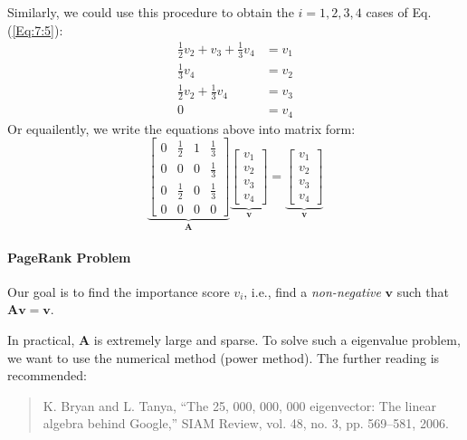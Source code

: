 \begin{example}
Similarly, we could use this procedure to obtain the $i=1,2,3,4$ cases of Eq.(\ref{Eq:7:5}):
\begin{align*}
\frac{1}{2}v_2+v_3+\frac{1}{3}v_4&=v_1\\
\frac{1}{3}v_4&=v_2\\
\frac{1}{2}v_2+\frac{1}{3}v_4&=v_3\\
0&=v_4
\end{align*}
Or equailently, we write the equations above into matrix form:
\[
\underbrace{\begin{bmatrix}
0&\frac{1}{2}&1&\frac{1}{3}\\
0&0&0&\frac{1}{3}\\
0&\frac{1}{2}&0&\frac{1}{3}\\
0&0&0&0
\end{bmatrix}}_{\bm A}\underbrace{\begin{bmatrix}
v_1\\v_2\\v_3\\v_4
\end{bmatrix}}_{\bm v}=\underbrace{\begin{bmatrix}
v_1\\v_2\\v_3\\v_4
\end{bmatrix}}_{\bm v}
\]
\end{example}
\paragraph{PageRank Problem}Our goal is to find the importance score $v_i$, i.e., find a \emph{non-negative} $\bm v$ such that $\bm{Av}=\bm v$. 

In practical, $\bm A$ is extremely large and sparse. To solve such a eigenvalue problem, we want to use the numerical method (power method). The further reading is recommended:
\begin{quotation}
K. Bryan and L. Tanya, “The 25, 000, 000, 000 eigenvector: The linear
algebra behind Google,” SIAM Review, vol. 48, no. 3, pp. 569–581, 2006.
\end{quotation}



